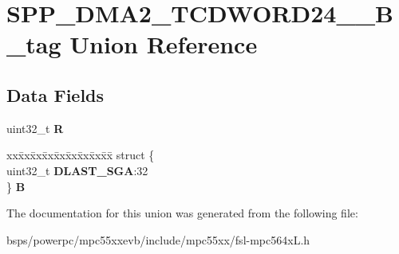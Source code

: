 \hypertarget{unionSPP__DMA2__TCDWORD24____32B__tag}{}\section{S\+P\+P\+\_\+\+D\+M\+A2\+\_\+\+T\+C\+D\+W\+O\+R\+D24\+\_\+\+\_\+B\+\_\+tag Union Reference}
\label{unionSPP__DMA2__TCDWORD24____32B__tag}
\subsection*{Data Fields}
\begin{DoxyCompactItemize}
\item 
\mbox{\label{unionSPP__DMA2__TCDWORD24____32B__tag_ac5c34af90e5ef3556a96baff2bbda0c1}} 
uint32\+\_\+t {\bfseries R}
\item 
\mbox{\label{unionSPP__DMA2__TCDWORD24____32B__tag_a651c838b11c51163b835bf4167526344}} 
\begin{tabbing}
xx\=xx\=xx\=xx\=xx\=xx\=xx\=xx\=xx\=\kill
struct \{\\
\>uint32\_t {\bfseries DLAST\_SGA}:32\\
\} {\bfseries B}\\

\end{tabbing}\end{DoxyCompactItemize}


The documentation for this union was generated from the following file\+:\begin{DoxyCompactItemize}
\item 
bsps/powerpc/mpc55xxevb/include/mpc55xx/fsl-\/mpc564x\+L.\+h\end{DoxyCompactItemize}
